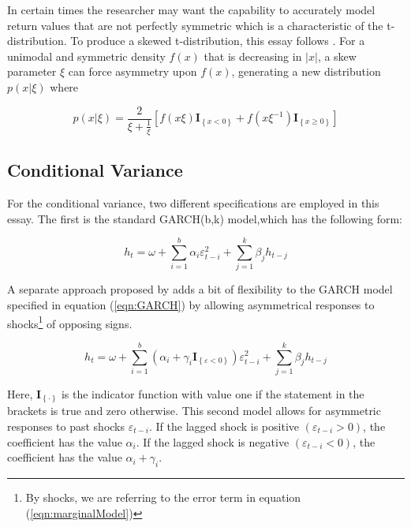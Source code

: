 \documentclass[12pt]{article}
\begin{document}
In certain times the researcher may want the capability to accurately model return values that are not perfectly symmetric which is a characteristic of the t-distribution. To produce a skewed t-distribution, this essay follows \cite{Fernandez_and_Steel_1998}. For a unimodal and symmetric density $f\left(x\right)$ that is decreasing in $\left\vert x\right\vert$, a skew parameter $\xi$ can force asymmetry upon $f\left(x\right)$, generating a new distribution $p\left(x|\xi\right)$ where

\begin{equation}
	p\left(x|\xi \right) = \frac{2}{\xi + \frac{1}{\xi}} \left[f\left(x\xi\right) \mathbf{I}_{\left\{x < 0\right\}} + f\left(x\xi^{-1}\right) \mathbf{I}_{\left\{x \geq 0\right\}}\right]
\end{equation}


\subsection{Conditional Variance}

For the conditional variance, two different specifications are employed in this essay. The first is the standard GARCH(b,k) model,which has the following form:

\begin{equation} \label{eqn:GARCH}
	h_{t} = \omega + \sum_{i = 1}^{b}\alpha_{i} \varepsilon_{t - i}^{2} + \sum_{j = 1}^{k}\beta_{j} h_{t - j}
\end{equation}

A separate approach proposed by \cite{GJR_1993} adds a bit of flexibility to the GARCH model specified in equation (\ref{eqn:GARCH}) by allowing asymmetrical responses to shocks\footnote{By shocks, we are referring to the error term in equation (\ref{eqn:marginalModel})} of opposing signs. 

\begin{equation} \label{eq:gjrGARCH_definition}
	h_{t} = \omega + \sum_{i = 1}^{b}\left(\alpha_{i} + \gamma_{i}\mathbf{I}_{\left\{\varepsilon < 0 \right\}}\right) \varepsilon_{t - i}^{2} + \sum_{j = 1}^{k}\beta_{j}h_{t- j}
\end{equation}

Here, $\mathbf{I}_{\left\{ \cdot \right\}}$ is the indicator function with value one if the statement in the brackets is true and zero otherwise. This second model allows for asymmetric responses to past shocks $\varepsilon_{t-i}$. If the lagged shock is positive $\left(\varepsilon_{t-i}>0\right)$, the coefficient has the value $\alpha_{i}$. If the lagged shock is negative $\left(\varepsilon_{t-i} < 0 \right)$, the coefficient has the value $\alpha_{i} + \gamma_{i}$.
\end{document}
